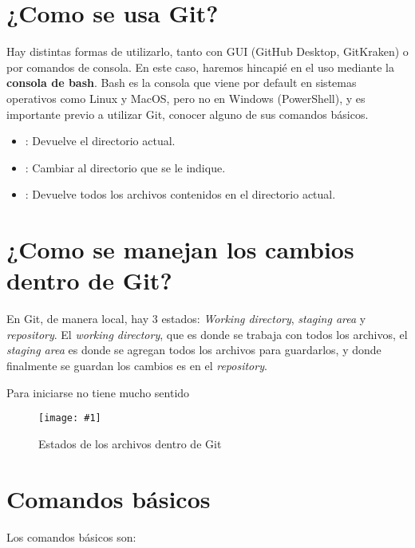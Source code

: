 \documentclass[11pt, twoside]{article}
\newcommand{\img}[3]{\begin{figure}[h] \centering
    \texttt{[image: \#1]}
    \caption{#2}
    \end{figure}}
\newcommand{\code}[1]{\color{Blue}\texttt{\detokenize{#1}}\color{Black}}
\begin{document}
\section{¿Como se usa Git?}
Hay distintas formas de utilizarlo, tanto con GUI (GitHub Desktop, GitKraken) o por comandos de consola. En este caso, haremos hincapié en el uso mediante la \textbf{consola de bash}. Bash es la consola que viene por default en sistemas operativos como Linux y MacOS, pero no en Windows (PowerShell), y es importante previo a utilizar Git, conocer alguno de sus comandos básicos.

\begin{itemize}
    \item \code{pwd}: Devuelve el directorio actual.
    \item \code{cd <path>}: Cambiar al directorio que se le indique.
    \item \code{ls}: Devuelve todos los archivos contenidos en el directorio actual.
\end{itemize}



\section{¿Como se manejan los cambios dentro de Git?}

En Git, de manera local, hay 3 estados:\textit{ Working directory}, \textit{staging area} y \textit{repository}. El \textit{working directory}, que es donde se trabaja con todos los archivos, el \textit{staging area} es donde se agregan todos los archivos para guardarlos, y donde finalmente se guardan los cambios es en el \textit{repository}.

Para iniciarse no tiene mucho sentido 

\img{gitstate.png}{Estados de los archivos dentro de Git}{1}

\newpage 

\section{Comandos básicos}

Los comandos básicos son:
\end{document}

